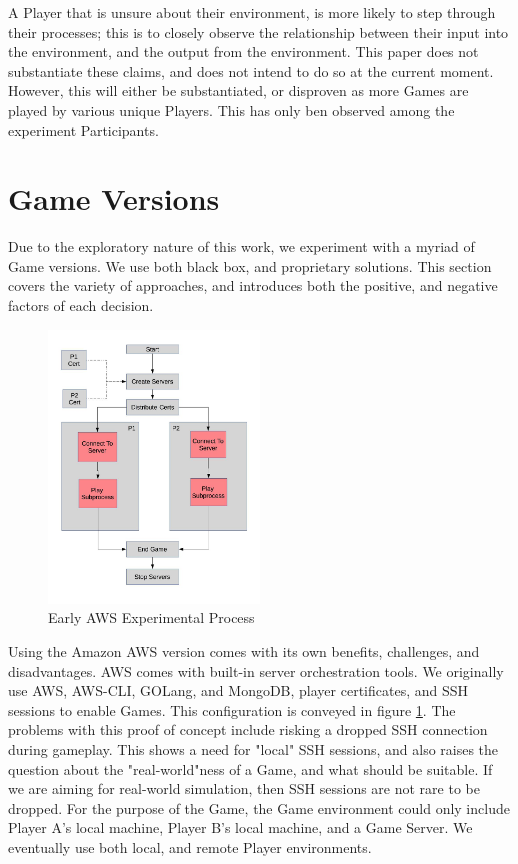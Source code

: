 \documentclass[10pt, titlepage, twocolumn]{article}
\begin{document}
A Player that is unsure about their environment, is more likely to step through their processes; this is to closely observe the relationship between their input into the environment, and the output from the environment. This paper does not substantiate these claims, and does not intend to do so at the current moment. However, this will either be substantiated, or disproven as more Games are played by various unique Players. This has only ben observed among the experiment Participants.



\section{Game Versions} \label{gameV}
Due to the exploratory nature of this work, we experiment with a myriad of Game versions. We use both black box, and proprietary solutions. This section covers the variety of approaches, and introduces both the positive, and negative factors of each decision.


\begin{figure}[ht]
	\centering
	\includegraphics[width=0.5\textwidth]{game_flow}
	\caption{Early AWS Experimental Process }
	\label{game_flow}
\end{figure}

Using the Amazon AWS version comes with its own benefits, challenges, and disadvantages. AWS comes with built-in server orchestration tools. We originally use AWS, AWS-CLI, GOLang, and MongoDB, player certificates, and SSH sessions to enable Games. This configuration is conveyed in figure \ref{game_flow}. The problems with this proof of concept include risking a dropped SSH connection during gameplay. This shows a need for "local" SSH sessions, and also raises the question about the "real-world"ness of a Game, and what should be suitable. If we are aiming for real-world simulation, then SSH sessions are not rare to be dropped. For the purpose of the Game, the Game environment could only include Player A's local machine, Player B's local machine, and a Game Server. We eventually use both local, and remote Player environments.
\end{document}
